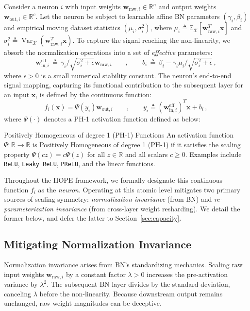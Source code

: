 \documentclass[11pt, a4paper, copyright, gdm]{google}
\newcommand{\wVect}{\boldsymbol{w}}
\newcommand{\xVect}{\boldsymbol{x}}
\newcommand{\calX}{\mathcal{X}}
\newcommand{\R}{\mathbb{R}}
\newcommand{\E}{\mathbb{E}}
\newcommand{\ReLU}{\texttt{ReLU}\xspace}
\DeclareMathOperator{\Var}{Var}
\theoremstyle{definition}
\begin{document}
Consider a neuron $i$ with input weights $\wVect_{\text{raw},i} \in \R^n$ and output weights $\wVect_{\text{out},i} \in \R^c$. Let the neuron be subject to learnable affine BN parameters $(\gamma_i, \beta_i)$ and empirical moving dataset statistics $(\mu_i, \sigma_i^2)$, where $\mu_i \triangleq \E_{\calX}[\wVect_{\text{raw},i}^T \xVect]$ and $\sigma_i^2 \triangleq \Var_{\calX}(\wVect_{\text{raw},i}^T \xVect)$. To capture the signal reaching the non-linearity, we absorb the normalization operations into a set of \textit{effective} parameters:
\begin{equation}
\label{eq:eff_params}
\wVect_{\text{in},i}^{\text{eff}} \,\triangleq\, \gamma_i/\sqrt{\sigma_i^2 + \epsilon} \wVect_{\text{raw},i} \qquad , \qquad b_i \,\triangleq\, \beta_i - \gamma_i \mu_i/\sqrt{\sigma_i^2 + \epsilon} \,,
\end{equation}
where $\epsilon > 0$ is a small numerical stability constant. The neuron's end-to-end signal mapping, capturing its functional contribution to the subsequent layer for an input $\xVect$, is defined by the continuous function:
\begin{equation}
f_i(\xVect) = \Psi(y_i) \wVect_{\text{out},i} \qquad, \qquad y_i \triangleq  (\wVect_{\text{in},i}^{\text{eff}})^T \xVect + b_i \,,
\end{equation}
where $\Psi(\cdot)$ denotes a PH-1 activation function defined as below:
\begin{insight}{Positively Homogeneous of degree 1 (PH-1) Functions}
An activation function $\Psi: \R \rightarrow \R$ is Positively Homogeneous of degree 1 (PH-1) if it satisfies the scaling property $\Psi(c z) = c \Psi(z)$ for all $z \in \R$ and all scalars $c \geq 0$. Examples include \ReLU, \texttt{Leaky ReLU}, \texttt{PReLU}, and the linear functions.
\end{insight}

Throughout the HOPE framework, we formally designate this continuous function $f_i$ as the \textit{neuron}. Operating at this atomic level mitigates two primary sources of scaling symmetry: \textit{normalization invariance} (from BN) and \textit{re-parameterization invariance} (from cross-layer weight resharding). We detail the former below, and defer the latter to Section~\ref{sec:capacity}.

\subsection{Mitigating Normalization Invariance}
Normalization invariance arises from BN's standardizing mechanics. Scaling raw input weights $\wVect_{\text{raw},i}$ by a constant factor $\lambda > 0$ increases the pre-activation variance by $\lambda^2$. The subsequent BN layer divides by the standard deviation, canceling $\lambda$ before the non-linearity. Because downstream output remains unchanged, raw weight magnitudes can be deceptive.
\end{document}
